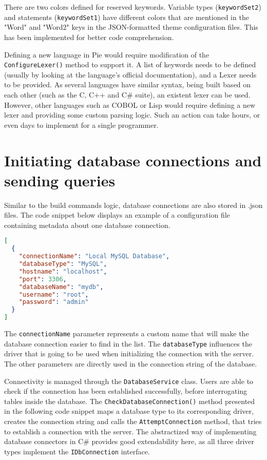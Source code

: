 There are two colors defined for reserved keywords. Variable types (\texttt{keywordSet2}) and statements (\texttt{keywordSet1}) have different colors that are mentioned in the "Word" and "Word2" keys in the JSON-formatted theme configuration files. This has been implemented for better code comprehension.

Defining a new language in Pie would require modification of the \texttt{ConfigureLexer()} method to support it. A list of keywords needs to be defined (usually by looking at the language's official documentation), and a Lexer needs to be provided. As several languages have similar syntax, being built based on each other (such as the C, C++ and C\# suite), an existent lexer can be used. However, other languages such as COBOL or Lisp would require defining a new lexer and providing some custom parsing logic. Such an action can take hours, or even days to implement for a single programmer.

\section{Initiating database connections and sending queries}

Similar to the build commands logic, database connections are also stored in .json files. The code snippet below displays an example of a configuration file containing metadata about one database connection. 

\begin{lstlisting}[language=json, caption={Structure of the JSON-formatted database connections file in Pie}]
[
  {
    "connectionName": "Local MySQL Database",
    "databaseType": "MySQL",
    "hostname": "localhost",
    "port": 3306,
    "databaseName": "mydb",
    "username": "root",
    "password": "admin"
  }
]
\end{lstlisting}

The \texttt{connectionName} parameter represents a custom name that will make the database connection easier to find in the list. The \texttt{databaseType} influences the driver that is going to be used when initializing the connection with the server. The other parameters are directly used in the connection string of the database.

Connectivity is managed through the \texttt{DatabaseService} class. Users are able to check if the connection has been established successfully, before interrogating tables inside the database. The \texttt{CheckDatabaseConnection()} method presented in the following code snippet maps a database type to its corresponding driver, creates the connection string and calls the \texttt{AttemptConnection} method, that tries to establish a connection with the server. The abstractized way of implementing database connectors in C\# provides good extendability here, as all three driver types implement the \texttt{IDbConnection} interface.

